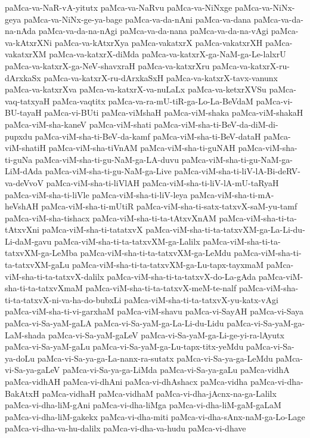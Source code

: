 {paMca-va-NaR-vA-yitutx
paMca-va-NaRvu
paMca-va-NiNxge
paMca-va-NiNx-geya
paMca-va-NiNx-ge-ya-bage
paMca-va-da-nAni
paMca-va-dana
paMca-va-da-na-nAda
paMca-va-da-na-nAgi
paMca-va-da-nana
paMca-va-da-na-vAgi
paMca-va-kAtxrXNi
paMca-va-kAtxrXya
paMca-vakatxrX
paMca-vakatxrXH
paMca-vakatxrXM
paMca-va-katxrX-diMda
paMca-va-katxrX-ga-NaM-ga-Le-lalxrU
paMca-va-katxrX-ga-NeV-shavxraH
paMca-va-katxrXru
paMca-va-katxrX-ru-dArxkaSx
paMca-va-katxrX-ru-dArxkaSxH
paMca-va-katxrX-tavx-vanunx
paMca-va-katxrXva
paMca-va-katxrX-va-nuLaLx
paMca-va-ketxrXVSu
paMca-vaq-tatxyaH
paMca-vaqtitx
paMca-va-ra-mU-tiR-ga-Lo-La-BeVdaM
paMca-vi-BU-tayaH
paMca-vi-BUti
paMca-viMshaH
paMca-viM-shaka
paMca-viM-shakaH
paMca-viM-sha-kaneV
paMca-viM-shati
paMca-viM-sha-ti-BeV-da-diM-di-pupxdu
paMca-viM-sha-ti-BeV-da-kamf
paMca-viM-sha-ti-BeV-dataH
paMca-viM-shatiH
paMca-viM-sha-tiVnAM
paMca-viM-sha-ti-guNAH
paMca-viM-sha-ti-guNa
paMca-viM-sha-ti-gu-NaM-ga-LA-duvu
paMca-viM-sha-ti-gu-NaM-ga-LiM-dAda
paMca-viM-sha-ti-gu-NaM-ga-Live
paMca-viM-sha-ti-liV-lA-Bi-deRV-va-deVvoV
paMca-viM-sha-ti-liVlAH
paMca-viM-sha-ti-liV-lA-mU-taRyaH
paMca-viM-sha-ti-liVle
paMca-viM-sha-ti-liV-leya
paMca-viM-sha-ti-mA-heVshAH
paMca-viM-sha-ti-mUtiR
paMca-viM-sha-ti-satx-tatxvX-saM-yu-tamf
paMca-viM-sha-tishacx
paMca-viM-sha-ti-ta-tAtxvXnAM
paMca-viM-sha-ti-ta-tAtxvXni
paMca-viM-sha-ti-tatatxvX
paMca-viM-sha-ti-ta-tatxvXM-ga-La-Li-du-Li-daM-gavu
paMca-viM-sha-ti-ta-tatxvXM-ga-Lalilx
paMca-viM-sha-ti-ta-tatxvXM-ga-LeMba
paMca-viM-sha-ti-ta-tatxvXM-ga-LeMdu
paMca-viM-sha-ti-ta-tatxvXM-gaLu
paMca-viM-sha-ti-ta-tatxvXM-ga-Lu-tapx-tayxmaM
paMca-viM-sha-ti-ta-tatxvX-dalilx
paMca-viM-sha-ti-ta-tatxvX-do-La-gAda
paMca-viM-sha-ti-ta-tatxvXmaM
paMca-viM-sha-ti-ta-tatxvX-meM-te-nalf
paMca-viM-sha-ti-ta-tatxvX-ni-va-ha-do-bubxLi
paMca-viM-sha-ti-ta-tatxvX-yu-katx-vAgi
paMca-viM-sha-ti-vi-garxhaM
paMca-viM-shavu
paMca-vi-SayAH
paMca-vi-Saya
paMca-vi-Sa-yaM-gaLA
paMca-vi-Sa-yaM-ga-La-Li-du-Lidu
paMca-vi-Sa-yaM-ga-LaM-shada
paMca-vi-Sa-yaM-gaLeV
paMca-vi-Sa-yaM-ga-Li-ge-yi-ra-lAyutx
paMca-vi-Sa-yaM-gaLu
paMca-vi-Sa-yaM-ga-Lu-tapx-titx-yeMdu
paMca-vi-Sa-ya-doLu
paMca-vi-Sa-ya-ga-La-nanx-ra-sutatx
paMca-vi-Sa-ya-ga-LeMdu
paMca-vi-Sa-ya-gaLeV
paMca-vi-Sa-ya-ga-LiMda
paMca-vi-Sa-ya-gaLu
paMca-vidhA
paMca-vidhAH
paMca-vi-dhAni
paMca-vi-dhAshacx
paMca-vidha
paMca-vi-dha-BakAtxH
paMca-vidhaH
paMca-vidhaM
paMca-vi-dha-jAcnx-na-ga-Lalilx
paMca-vi-dha-liM-gAni
paMca-vi-dha-liMga
paMca-vi-dha-liM-gaM-gaLaM
paMca-vi-dha-liM-gakekx
paMca-vi-dha-miti
paMca-vi-dha-sAnx-naM-ga-Lo-Lage
paMca-vi-dha-va-hu-dalilx
paMca-vi-dha-va-hudu
paMca-vi-dhave
}

